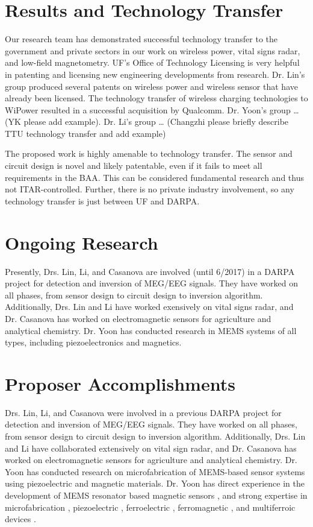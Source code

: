 \section{Results and Technology Transfer}

Our research team has demonstrated successful technology transfer to the government and private sectors in our work on wireless power, vital signs radar, and low-field magnetometry. UF's Office of Technology Licensing is very helpful in patenting and licensing new engineering developments from research. Dr. Lin’s group produced several patents on wireless power and wireless sensor that have already been licensed. The technology transfer of wireless charging technologies to WiPower resulted in a successful acquisition by Qualcomm. Dr. Yoon’s group … (YK please add example). Dr. Li’s group … (Changzhi please briefly describe TTU technology transfer and add example)

The proposed work is highly amenable to technology transfer. The sensor and circuit design is novel and likely patentable, even if it fails to meet all requirements in the BAA. This can be considered fundamental research and thus not ITAR-controlled. Further, there is no private industry involvement, so any technology transfer is just between UF and DARPA.

\section{Ongoing Research}
Presently, Drs. Lin, Li, and Casanova are involved (until 6/2017) in a DARPA project for detection and inversion of MEG/EEG signals. They have worked on all phases, from sensor design to circuit design to inversion algorithm. Additionally, Drs. Lin and Li have worked exensively on vital signs radar, and Dr. Casanova has worked on electromagnetic sensors for agriculture and analytical chemistry. Dr. Yoon has conducted research in MEMS systems of all types, including piezoelectronics and magnetics.

\section{Proposer Accomplishments}
Drs. Lin, Li, and Casanova were involved in a previous DARPA project for detection and inversion of MEG/EEG signals. They have worked on all phases, from sensor design to circuit design to inversion algorithm. Additionally, Drs. Lin and Li have collaborated extensively on vital sign radar, and Dr. Casanova has worked on electromagnetic sensors for agriculture and analytical chemistry. Dr. Yoon has conducted research on microfabrication of MEMS-based sensor systems using piezoelectric and magnetic materials. Dr. Yoon has direct experience in the development of MEMS resonator based magnetic sensors \cite{choi2006magnetically, choi2006magnetically2, choi2011nonlinear}, and strong expertise in microfabrication \cite{yoon2006multidirectional}, piezoelectric \cite{wulateral}, ferroelectric \cite{kim2014microwave,yoon2005low,yoon2003reduced}, ferromagnetic \cite{rahimi2016study,rahimi2015cylindrical,yoon2013multi}, and multiferroic devices \cite{yoon2013multi,kim2014room}.

